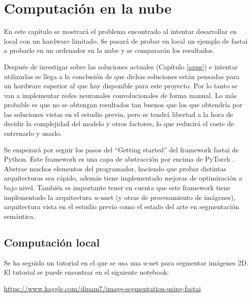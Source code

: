 \chapter{Computación en la nube}\label{cloudcomputing}

En este capítulo se mostrará el problema encontrado al intentar desarrollar en local con un hardware limitado. Se pasará de probar en local un ejemplo de fastai a probarlo en un ordenador en la nube y se compararán los resultados.

Después de investigar sobre las soluciones actuales (Capítulo \ref{apps}) e intentar utilizarlas se llega a la conclusión de que dichas soluciones están pensadas para un hardware superior al que hay disponible para este proyecto. Por lo tanto se van a implementar redes neuronales convolucionales de forma manual. Lo más probable es que no se obtengan resultados tan buenos que los que obtendría por las soluciones vistas en el estudio previo, pero se tendrá libertad a la hora de decidir la complejidad del modelo y otros factores, lo que reducirá el coste de entrenarlo y usarlo.

Se empezará por seguir los pasos del “Getting started” del framework fastai \cite{Howard2018} de Python. Este framework es una capa de abstracción por encima de PyTorch \cite{Paszke2019}. Abstrae muchos elementos del programador, haciendo que probar distintas arquitecturas sea rápido, además tiene implementado mejoras de optimización a bajo nivel. También es importante tener en cuenta que este framework tiene implementado la arquitectura u-unet (y otras de procesamiento de imágenes), arquitectura vista en el estudio previo como el estado del arte en segmentación semántica.

\section{Computación local}\label{sec:local_dev}

Se ha seguido un tutorial en el que se usa una u-net para segmentar imágenes 2D. El tutorial se puede encontrar en el siguiente notebook:

\url{https://www.kaggle.com/dipam7/image-segmentation-using-fastai}

